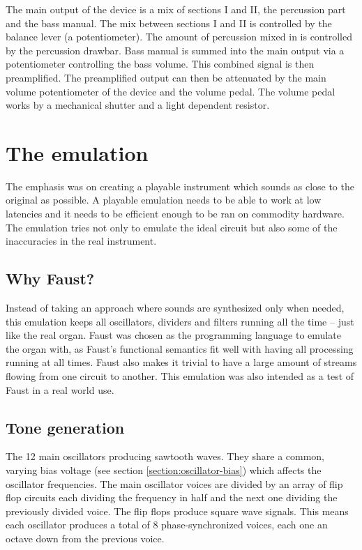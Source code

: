 \documentclass[11pt,a4paper]{article}
\begin{document}
The main output of the device is a mix of sections I and II, the percussion part and the bass manual. The mix between sections I and II is controlled by the balance lever (a potentiometer). The amount of percussion mixed in is controlled by the percussion drawbar. Bass manual is summed into the main output via a potentiometer controlling the bass volume. This combined signal is then preamplified. The preamplified output can then be attenuated by the main volume potentiometer of the device and the volume pedal. The volume pedal works by a mechanical shutter and a light dependent resistor.

\section{The emulation} 

The emphasis was on creating a playable instrument which sounds as close to the original as possible. A playable emulation needs to be able to work at low latencies and it needs to be efficient enough to be ran on commodity hardware. The emulation tries not only to emulate the ideal circuit but also some of the inaccuracies in the real instrument. 

\subsection{Why Faust?}

Instead of taking an approach where sounds are synthesized only when needed, this emulation keeps all oscillators, dividers and filters running all the time -- just like the real organ. Faust was chosen as the programming language to emulate the organ with, as Faust's functional semantics fit well with having all processing running at all times. Faust also makes it trivial to have a large amount of streams flowing from one circuit to another. This emulation was also intended as a test of Faust in a real world use.

\subsection{Tone generation}
\label{section:tone-generation}

The 12 main oscillators producing sawtooth waves. They share a common, varying bias voltage (see section \ref{section:oscillator-bias}) which affects the oscillator frequencies. The main oscillator voices are divided by an array of flip flop circuits each dividing the frequency in half and the next one dividing the previously divided voice. The flip flops produce square wave signals. This means each oscillator produces a total of  8 phase-synchronized voices, each one an octave down from the previous voice.
\end{document}
